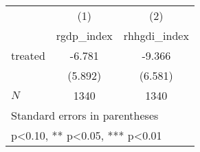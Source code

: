 {
\def\sym#1{\ifmmode^{#1}\else\(^{#1}\)\fi}
\begin{tabular}{l*{2}{c}}
\hline\hline
            &\multicolumn{1}{c}{(1)}&\multicolumn{1}{c}{(2)}\\
            &\multicolumn{1}{c}{rgdp\_index}&\multicolumn{1}{c}{rhhgdi\_index}\\
\hline
treated     &      -6.781   &      -9.366   \\
            &     (5.892)   &     (6.581)   \\
\hline
\(N\)       &        1340   &        1340   \\
\hline\hline
\multicolumn{3}{l}{\footnotesize Standard errors in parentheses}\\
\multicolumn{3}{l}{\footnotesize * p<0.10, ** p<0.05, *** p<0.01}\\
\end{tabular}
}
